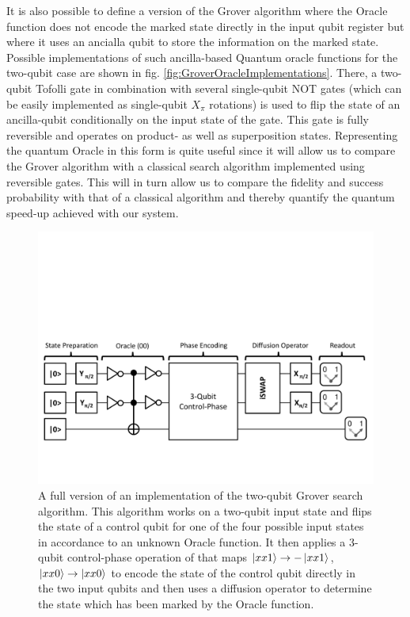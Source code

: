 It is also possible to define a version of the Grover algorithm where the Oracle function does not encode the marked state directly in the input qubit register but where it uses an ancialla qubit to store the information on the marked state. Possible implementations of such ancilla-based Quantum oracle functions for the two-qubit case are shown in fig. \ref{fig:GroverOracleImplementations}. There, a two-qubit Tofolli gate in combination with several single-qubit NOT gates (which can be easily implemented as single-qubit $X_{\pi}$ rotations) is used to flip the state of an ancilla-qubit conditionally on the input state of the gate. This gate is fully reversible and operates on product- as well as superposition states. Representing the quantum Oracle in this form is quite useful since it will allow us to compare the Grover algorithm with a classical search algorithm implemented using reversible gates. This will in turn allow us to compare the fidelity and success probability with that of a classical algorithm and thereby quantify the quantum speed-up achieved with our system. 

\begin{figure}[ht!]
	\centering
		\includegraphics[width=1\textwidth]{./material/papers/grover/quantum_algorithm_full}
	\caption[Full version of an implementation of the two-qubit Grover search algorithm]{A full version of an implementation of the two-qubit Grover search algorithm. This algorithm works on a two-qubit input state and flips the state of a control qubit for one of the four possible input states in accordance to an unknown Oracle function. It then applies a 3-qubit control-phase operation of that maps $\left| xx1 \right>\to -\left| xx1 \right>$, $\left| xx0 \right>\to\left| xx0 \right>$ to encode the state of the control qubit directly in the two input qubits and then uses a diffusion operator to determine the state which has been marked by the Oracle function.}
	\label{fig:GroverAlgorithmFullSchematic}
\end{figure}

